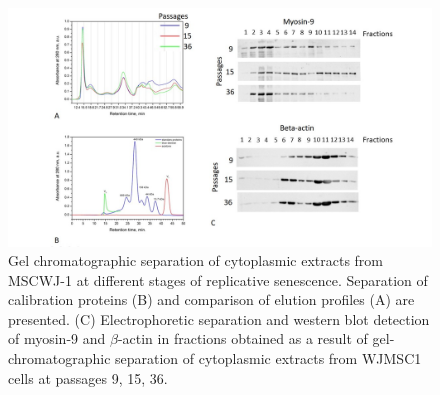 \documentclass[alpha-refs]{wiley-article}
\begin{document}
\begin{figure}[hbt!]
\centering
\includegraphics[width=1\linewidth]{fplc.jpg}
\caption{ Gel chromatographic separation of cytoplasmic extracts from MSCWJ-1 at different stages of replicative senescence. Separation of calibration proteins (B) and comparison of elution profiles (A) are presented. (C) Electrophoretic separation and western blot detection of myosin-9 and $\beta$-actin in fractions obtained as a result of gel-chromatographic separation of cytoplasmic extracts from WJMSC1 cells at passages 9, 15, 36.}
\end{figure}

\end{document}
